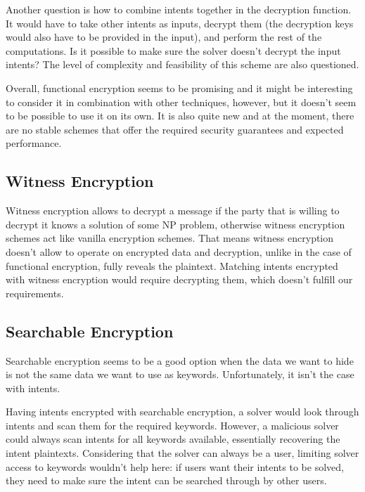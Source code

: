 \documentclass[
    9pt,            %
    report,        %
    affiltop,       %
]{art}
\begin{document}
\hfill

Another question is how to combine intents together in the decryption function. It would have to take other intents as inputs, decrypt them (the decryption keys would also have to be provided in the input), and perform the rest of the computations. Is it possible to make sure the solver doesn't decrypt the input intents? The level of complexity and feasibility of this scheme are also questioned.

\hfill

Overall, functional encryption seems to be promising and it might be interesting to consider it in combination with other techniques, however, but it doesn't seem to be possible to use it on its own. It is also quite new and at the moment, there are no stable schemes that offer the required security guarantees and expected performance.


\subsection{Witness Encryption}

Witness encryption allows to decrypt a message if the party that is willing to decrypt it knows a solution of some NP problem, otherwise witness encryption schemes act like vanilla encryption schemes. That means witness encryption doesn't allow to operate on encrypted data and decryption, unlike in the case of functional encryption, fully reveals the plaintext. Matching intents encrypted with witness encryption would require decrypting them, which doesn't fulfill our requirements.

\subsection{Searchable Encryption}

Searchable encryption seems to be a good option when the data we want to hide is not the same data we want to use as keywords. Unfortunately, it isn't the case with intents.

Having intents encrypted with searchable encryption, a solver would look through intents and scan them for the required keywords. However, a malicious solver could always scan intents for all keywords available, essentially recovering the intent plaintexts. Considering that the solver can always be a user, limiting solver access to keywords wouldn't help here: if users want their intents to be solved, they need to make sure the intent can be searched through by other users. 
\end{document}
